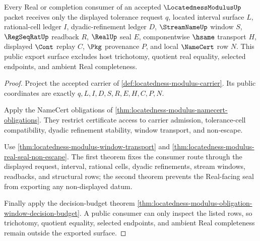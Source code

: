 \begin{theorem}
\label{thm:locatedness-modulus-public-export}
Every Real or completion consumer of an accepted $\LocatednessModulusUp$ packet receives only the displayed tolerance request $q$, located interval surface $L$, rational-cell ledger $I$, dyadic-refinement ledger $D$, $\StreamNameUp$ window $S$, $\RegSeqRatUp$ readback $R$, $\RealUp$ seal $E$, componentwise $\hsame$ transport $H$, displayed $\Cont$ replay $C$, $\Pkg$ provenance $P$, and local $\NameCert$ row $N$. This public export surface excludes host trichotomy, quotient real equality, selected endpoints, and ambient Real completeness.
\end{theorem}
\begin{proof}
Project the accepted carrier of \autoref{def:locatedness-modulus-carrier}. Its public coordinates are exactly $q,L,I,D,S,R,E,H,C,P,N$.

Apply the NameCert obligations of \autoref{thm:locatedness-modulus-namecert-obligations}. They restrict certificate access to carrier admission, tolerance-cell compatibility, dyadic refinement stability, window transport, and non-escape.

Use \autoref{thm:locatedness-modulus-window-transport} and \autoref{thm:locatedness-modulus-real-seal-non-escape}. The first theorem fixes the consumer route through the displayed request, interval, rational cells, dyadic refinements, stream windows, readbacks, and structural rows; the second theorem prevents the Real-facing seal from exporting any non-displayed datum.

Finally apply the decision-budget theorem \autoref{thm:locatedness-modulus-obligation-window-decision-budget}. A public consumer can only inspect the listed rows, so trichotomy, quotient equality, selected endpoints, and ambient Real completeness remain outside the exported surface.
\end{proof}


